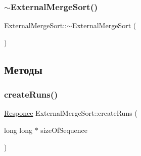 \subsubsection{\texorpdfstring{$\sim$\+External\+Merge\+Sort()}{~ExternalMergeSort()}}
{\footnotesize\ttfamily External\+Merge\+Sort\+::$\sim$\+External\+Merge\+Sort (\begin{DoxyParamCaption}{ }\end{DoxyParamCaption})\hspace{0.3cm}{\ttfamily [virtual]}}



\subsection{Методы}
\hypertarget{class_external_merge_sort_a54203f48d659003f5a75425354d4e262}{}\label{class_external_merge_sort_a54203f48d659003f5a75425354d4e262} 
\subsubsection{\texorpdfstring{create\+Runs()}{createRuns()}}
{\footnotesize\ttfamily \hyperlink{_structures_8h_a9864d6ef28dd6e38416afac4426b3491}{Responce} External\+Merge\+Sort\+::create\+Runs (\begin{DoxyParamCaption}\item[{long long $\ast$}]{size\+Of\+Sequence }\end{DoxyParamCaption})\hspace{0.3cm}{\ttfamily [private]}}

